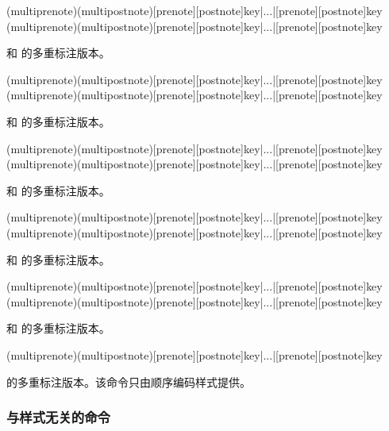 \begin{ltxsyntax}

(multiprenote)(multipostnote)[prenote][postnote]{key}|...|[prenote][postnote]{key}
(multiprenote)(multipostnote)[prenote][postnote]{key}|...|[prenote][postnote]{key}

 和  的多重标注版本。

(multiprenote)(multipostnote)[prenote][postnote]{key}|...|[prenote][postnote]{key}
(multiprenote)(multipostnote)[prenote][postnote]{key}|...|[prenote][postnote]{key}

 和  的多重标注版本。

(multiprenote)(multipostnote)[prenote][postnote]{key}|...|[prenote][postnote]{key}
(multiprenote)(multipostnote)[prenote][postnote]{key}|...|[prenote][postnote]{key}

 和  的多重标注版本。

(multiprenote)(multipostnote)[prenote][postnote]{key}|...|[prenote][postnote]{key}
(multiprenote)(multipostnote)[prenote][postnote]{key}|...|[prenote][postnote]{key}

 和  的多重标注版本。

(multiprenote)(multipostnote)[prenote][postnote]{key}|...|[prenote][postnote]{key}
(multiprenote)(multipostnote)[prenote][postnote]{key}|...|[prenote][postnote]{key}

 和  的多重标注版本。

(multiprenote)(multipostnote)[prenote][postnote]{key}|...|[prenote][postnote]{key}

 的多重标注版本。该命令只由顺序编码样式提供。

\end{ltxsyntax}

\subsubsection{与样式无关的命令} %
\label{use:cit:aut}

